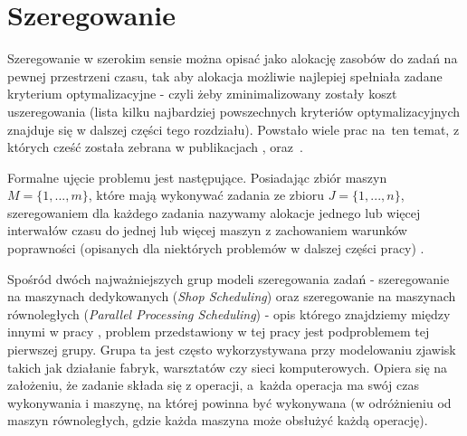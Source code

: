 \documentclass[brudnopis]{xmgr}
\begin{document}
\section{Szeregowanie}
Szeregowanie w szerokim sensie można opisać jako alokację zasobów do zadań na pewnej przestrzeni czasu, tak aby alokacja możliwie najlepiej spełniała zadane kryterium optymalizacyjne - czyli żeby zminimalizowany zostały koszt uszeregowania (lista kilku najbardziej powszechnych kryteriów optymalizacyjnych znajduje się w dalszej części tego rozdziału). Powstało wiele prac na~ten temat, z których cześć została zebrana w publikacjach \cite{graves1981review}, \cite{lawler1993sequencing} oraz~\cite{lee1997current}.
\medskip

Formalne ujęcie problemu jest następujące. Posiadając zbiór maszyn $M=\{1, ..., m\}$, które mają wykonywać zadania ze zbioru $J=\{1, ..., n\}$, szeregowaniem dla każdego zadania nazywamy alokacje jednego lub więcej interwałów czasu do jednej lub więcej maszyn z zachowaniem warunków poprawności (opisanych dla niektórych problemów w dalszej części pracy) \cite{brucker2007scheduling}.
\medskip


Spośród dwóch najważniejszych grup modeli szeregowania zadań - szeregowanie na maszynach dedykowanych (\emph{Shop Scheduling}) oraz szeregowanie na maszynach równoległych (\emph{Parallel Processing Scheduling}) - opis którego znajdziemy między innymi w pracy \cite{drozdowski2009scheduling}, problem przedstawiony w tej pracy jest podproblemem tej pierwszej grupy. Grupa ta jest często wykorzystywana przy modelowaniu zjawisk takich jak działanie fabryk, warsztatów czy sieci komputerowych.
Opiera się na założeniu, że zadanie składa się z operacji, a~każda operacja ma swój czas wykonywania i maszynę, na której powinna być wykonywana (w odróżnieniu od maszyn równoległych, gdzie każda maszyna może obsłużyć każdą operację).
\medskip
\end{document}
